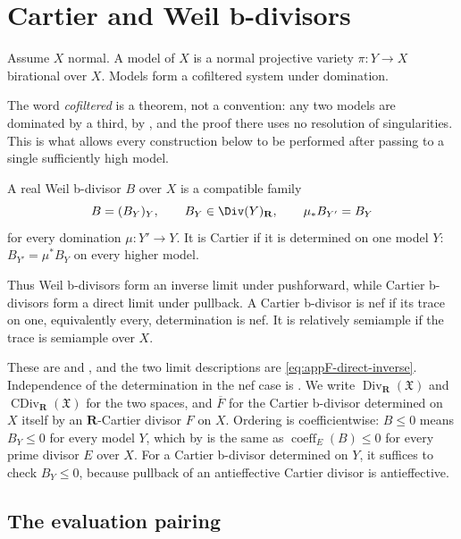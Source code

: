 \section{Cartier and Weil b-divisors}
\label{sec:ch35-bdivisors}

Assume $X$ normal.  A model of $X$ is a normal projective variety
$\pi:Y\to X$ birational over $X$.  Models form a cofiltered system under
domination.

The word \emph{cofiltered} is a theorem, not a convention: any two models
are dominated by a third, by
, and the proof there uses no resolution of
singularities.  This is what allows every construction below to be performed
after passing to a single sufficiently high model.

\begin{definition}[b-divisors]
\label{def:algebraic-bdivisors}
A real Weil b-divisor $B$ over $X$ is a compatible family
\begin{equation}
\label{eq:weil-bdivisor}
 B=(B_Y)_Y,\qquad B_Y\in\Div(Y)_{\mathbf R},\qquad
 \mu_*B_{Y'}=B_Y
\end{equation}
for every domination $\mu:Y'\to Y$.  It is Cartier if it is determined on
one model $Y$: $B_{Y'}=\mu^*B_Y$ on every higher model.
\end{definition}

Thus Weil b-divisors form an inverse limit under pushforward, while Cartier
b-divisors form a direct limit under pullback.  A Cartier b-divisor is nef if
its trace on one, equivalently every, determination is nef.  It is
relatively semiample if the trace is semiample over $X$.

These are  and
, and the two limit descriptions are
\eqref{eq:appF-direct-inverse}.  Independence of the determination in the
nef case is .  We write
$\operatorname{Div}_{\mathbf R}(\mathfrak X)$ and
$\operatorname{CDiv}_{\mathbf R}(\mathfrak X)$ for the two spaces, and
$\overline F$ for the Cartier b-divisor determined on $X$ itself by an
$\mathbf R$-Cartier divisor $F$ on $X$.  Ordering is coefficientwise:
$B\leq0$ means $B_Y\leq0$ for every model $Y$, which by
 is the same as
$\operatorname{coeff}_E(B)\leq0$ for every prime divisor $E$ over
$X$.  For a Cartier b-divisor determined on $Y$, it suffices to check
$B_Y\leq0$, because pullback of an antieffective Cartier divisor is
antieffective.

\subsection{The evaluation pairing}
\label{sec:ch35-evaluation-pairing}

